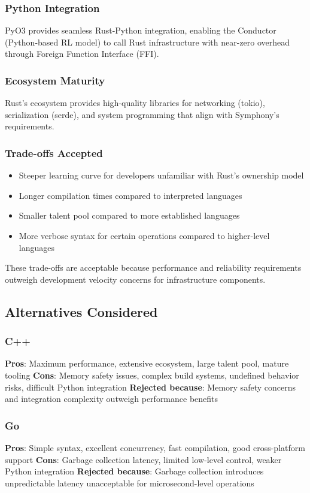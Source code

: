 \subsubsection*{Python Integration}
PyO3 provides seamless Rust-Python integration, enabling the Conductor (Python-based RL model) to call Rust infrastructure with near-zero overhead through Foreign Function Interface (FFI).

\subsubsection*{Ecosystem Maturity}
Rust's ecosystem provides high-quality libraries for networking (tokio), serialization (serde), and system programming that align with Symphony's requirements.

\subsubsection*{Trade-offs Accepted}
\begin{itemize}
\item Steeper learning curve for developers unfamiliar with Rust's ownership model
\item Longer compilation times compared to interpreted languages
\item Smaller talent pool compared to more established languages
\item More verbose syntax for certain operations compared to higher-level languages
\end{itemize}

These trade-offs are acceptable because performance and reliability requirements outweigh development velocity concerns for infrastructure components.

\subsection*{Alternatives Considered}

\subsubsection*{C++}
\textbf{Pros}: Maximum performance, extensive ecosystem, large talent pool, mature tooling
\textbf{Cons}: Memory safety issues, complex build systems, undefined behavior risks, difficult Python integration
\textbf{Rejected because}: Memory safety concerns and integration complexity outweigh performance benefits

\subsubsection*{Go}
\textbf{Pros}: Simple syntax, excellent concurrency, fast compilation, good cross-platform support
\textbf{Cons}: Garbage collection latency, limited low-level control, weaker Python integration
\textbf{Rejected because}: Garbage collection introduces unpredictable latency unacceptable for microsecond-level operations


